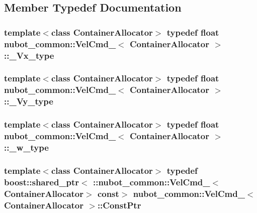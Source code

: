 \subsection{Member Typedef Documentation}
\hypertarget{structnubot__common_1_1VelCmd___a2c1ee6d1985c76294e058cd55ed98346}{
\subsubsection[{\-\_\-\-Vx\-\_\-type}]{\setlength{\rightskip}{0pt plus 5cm}template$<$class Container\-Allocator$>$ typedef float {\bf nubot\-\_\-common\-::\-Vel\-Cmd\-\_\-}$<$ Container\-Allocator $>$\-::{\bf \-\_\-\-Vx\-\_\-type}}}\label{structnubot__common_1_1VelCmd___a2c1ee6d1985c76294e058cd55ed98346}
\hypertarget{structnubot__common_1_1VelCmd___af99ccc1753b4650b4beb815e54d28d1f}{
\subsubsection[{\-\_\-\-Vy\-\_\-type}]{\setlength{\rightskip}{0pt plus 5cm}template$<$class Container\-Allocator$>$ typedef float {\bf nubot\-\_\-common\-::\-Vel\-Cmd\-\_\-}$<$ Container\-Allocator $>$\-::{\bf \-\_\-\-Vy\-\_\-type}}}\label{structnubot__common_1_1VelCmd___af99ccc1753b4650b4beb815e54d28d1f}
\hypertarget{structnubot__common_1_1VelCmd___a3fae7dd67651497537f5eb1bde85d6cb}{
\subsubsection[{\-\_\-w\-\_\-type}]{\setlength{\rightskip}{0pt plus 5cm}template$<$class Container\-Allocator$>$ typedef float {\bf nubot\-\_\-common\-::\-Vel\-Cmd\-\_\-}$<$ Container\-Allocator $>$\-::{\bf \-\_\-w\-\_\-type}}}\label{structnubot__common_1_1VelCmd___a3fae7dd67651497537f5eb1bde85d6cb}
\hypertarget{structnubot__common_1_1VelCmd___a5a57f1d76c9209090962bf805a6d8cc8}{
\subsubsection[{Const\-Ptr}]{\setlength{\rightskip}{0pt plus 5cm}template$<$class Container\-Allocator$>$ typedef boost\-::shared\-\_\-ptr$<$ \-::{\bf nubot\-\_\-common\-::\-Vel\-Cmd\-\_\-}$<$Container\-Allocator$>$ const$>$ {\bf nubot\-\_\-common\-::\-Vel\-Cmd\-\_\-}$<$ Container\-Allocator $>$\-::{\bf Const\-Ptr}}}\label{structnubot__common_1_1VelCmd___a5a57f1d76c9209090962bf805a6d8cc8}
